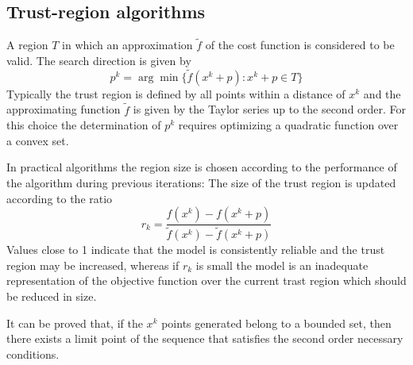 \documentclass{book}
\theoremstyle{theoremv2}
\theoremstyle{defv2}
\theoremstyle{remark}
\theoremstyle{remark}
\begin{document}
\subsection{Trust-region algorithms}
A region $T$ in which an approximation $\tilde{f}$ of the cost function is considered to be valid. The search direction is given by
\[
    p^k = \arg \min \{ \tilde{f}(x^k+p):x^k+p\in T \}
\]
Typically the trust region is defined by all points within a distance of $x^k$ and the approximating function $\tilde{f}$ is given by the Taylor series up to the second order. For this choice the determination of $p^k$ requires optimizing a quadratic function over a convex set.

In practical algorithms the region size is chosen according to the performance of the algorithm during previous iterations: The size of the trust region is updated according to the ratio
\[
    r_k = \displaystyle\frac{f(x^k)-f(x^k+p)}{\tilde{f}(x^k)-\tilde{f}(x^k+p)}
\]
Values close to 1 indicate that the model is consistently reliable and the trust region may be increased, whereas if $r_k$ is small the model is an inadequate representation of the objective function over the current trast region which should be reduced in size.

It can be proved that, if the $x^k$ points generated belong to a bounded set, then there exists a limit point of the sequence that satisfies the second order necessary conditions.
\end{document}
